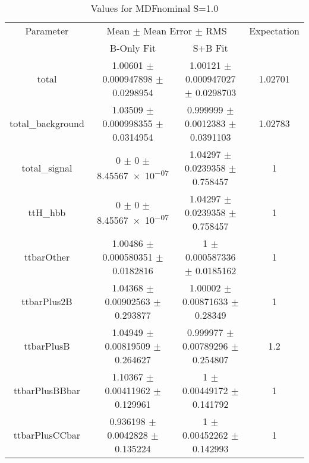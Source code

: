 \begin{table}
\centering
\caption{Values for MDFnominal S=1.0}
\begin{tabular}{cccc}
\toprule
Parameter & \multicolumn{2}{c}{Mean $\pm$ Mean Error $\pm$ RMS} & Expectation\\
 & B-Only Fit & S+B Fit & \\
\midrule
total & \num{1.00601} $\pm$ \num{0.000947898} $\pm$ \num{0.0298954} & \num{1.00121} $\pm$ \num{0.000947027} $\pm$ \num{0.0298703} & \num{1.02701}\\
total\_background & \num{1.03509} $\pm$ \num{0.000998355} $\pm$ \num{0.0314954} & \num{0.999999} $\pm$ \num{0.0012383} $\pm$ \num{0.0391103} & \num{1.02783}\\
total\_signal & \num{0} $\pm$ \num{0} $\pm$ \num{8.45567e-07} & \num{1.04297} $\pm$ \num{0.0239358} $\pm$ \num{0.758457} & \num{1}\\
ttH\_hbb & \num{0} $\pm$ \num{0} $\pm$ \num{8.45567e-07} & \num{1.04297} $\pm$ \num{0.0239358} $\pm$ \num{0.758457} & \num{1}\\
ttbarOther & \num{1.00486} $\pm$ \num{0.000580351} $\pm$ \num{0.0182816} & \num{1} $\pm$ \num{0.000587336} $\pm$ \num{0.0185162} & \num{1}\\
ttbarPlus2B & \num{1.04368} $\pm$ \num{0.00902563} $\pm$ \num{0.293877} & \num{1.00002} $\pm$ \num{0.00871633} $\pm$ \num{0.28349} & \num{1}\\
ttbarPlusB & \num{1.04949} $\pm$ \num{0.00819509} $\pm$ \num{0.264627} & \num{0.999977} $\pm$ \num{0.00789296} $\pm$ \num{0.254807} & \num{1.2}\\
ttbarPlusBBbar & \num{1.10367} $\pm$ \num{0.00411962} $\pm$ \num{0.129961} & \num{1} $\pm$ \num{0.00449172} $\pm$ \num{0.141792} & \num{1}\\
ttbarPlusCCbar & \num{0.936198} $\pm$ \num{0.0042828} $\pm$ \num{0.135224} & \num{1} $\pm$ \num{0.00452262} $\pm$ \num{0.142993} & \num{1}\\
\bottomrule
\end{tabular}
\end{table}